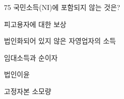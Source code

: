 \begin{question}{75}
국민소득(NI)에 포함되지 않는 것은?
\begin{choices}
  \item 피고용자에 대한 보상
  \item 법인화되어 있지 않은 자영업자의 소득
  \item 임대소득과 순이자
  \item 법인이윤
  \item 고정자본 소모량
\end{choices}
\end{question}
